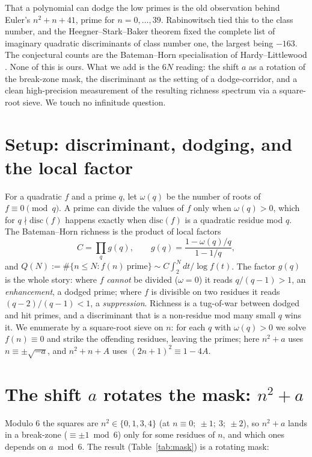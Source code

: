 \documentclass[11pt]{article}
\theoremstyle{definition}
\begin{document}
That a polynomial can dodge the low primes is the old observation behind Euler's
$n^2+n+41$, prime for $n=0,\dots,39$. Rabinowitsch \cite{Rab} tied this to the class number, and the
Heegner--Stark--Baker theorem \cite{Heegner,Stark,Baker} fixed the complete list of imaginary
quadratic discriminants of class number one, the largest being $-163$. The conjectural counts are the
Bateman--Horn specialisation of Hardy--Littlewood \cite{HL,BH}. None of this is ours. What we add is
the $6N$ reading: the shift $a$ as a rotation of the break-zone mask, the discriminant as the setting
of a dodge-corridor, and a clean high-precision measurement of the resulting richness spectrum via a
square-root sieve. We touch no infinitude question.

\section{Setup: discriminant, dodging, and the local factor}
For a quadratic $f$ and a prime $q$, let $\omega(q)$ be the number of roots of $f\equiv0\pmod q$. A
prime can divide the values of $f$ only when $\omega(q)>0$, which for $q\nmid\mathrm{disc}(f)$ happens
exactly when $\mathrm{disc}(f)$ is a quadratic residue mod $q$. The Bateman--Horn richness is the
product of local factors
\begin{equation}
C=\prod_q g(q),\qquad g(q)=\frac{1-\omega(q)/q}{1-1/q},
\label{eq:C}
\end{equation}
and $Q(N):=\#\{n\le N: f(n)\ \text{prime}\}\sim C\int_2^N dt/\log f(t)$. The factor $g(q)$ is the whole
story: where $f$ \emph{cannot} be divided ($\omega=0$) it reads $q/(q-1)>1$, an \emph{enhancement}, a
dodged prime; where $f$ is divisible on two residues it reads $(q-2)/(q-1)<1$, a \emph{suppression}.
Richness is a tug-of-war between dodged and hit primes, and a discriminant that is a non-residue mod
many small $q$ wins it. We enumerate by a square-root sieve on $n$: for each $q$ with $\omega(q)>0$ we
solve $f(n)\equiv0$ and strike the offending residues, leaving the primes; here $n^2+a$ uses
$n\equiv\pm\sqrt{-a}$, and $n^2+n+A$ uses $(2n+1)^2\equiv1-4A$.

\section{The shift $a$ rotates the mask: $n^2+a$}
Modulo $6$ the squares are $n^2\in\{0,1,3,4\}$ (at $n\equiv0;\ \pm1;\ 3;\ \pm2$), so $n^2+a$ lands in a
break-zone ($\equiv\pm1\bmod6$) only for some residues of $n$, and which ones depends on $a\bmod6$.
The result (Table~\ref{tab:mask}) is a rotating mask:
\end{document}

